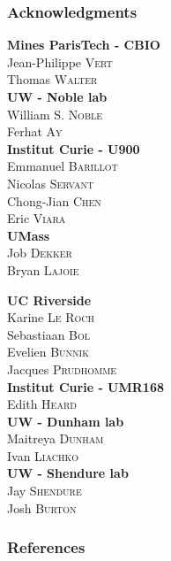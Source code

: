 \documentclass[xcolor=dvipsnames]{beamer}
\begin{document}
\begin{frame}
\frametitle{Acknowledgments}
\fboxsep=0pt
\noindent
\begin{minipage}[t]{0.48\linewidth}
\textbf{Mines ParisTech - CBIO} \\
Jean-Philippe \textsc{Vert} \\
Thomas \textsc{Walter} \\

\textbf{UW - Noble lab} \\
William S. \textsc{Noble} \\
Ferhat \textsc{Ay} \\

\textbf{Institut Curie - U900} \\
Emmanuel \textsc{Barillot} \\
Nicolas \textsc{Servant} \\
Chong-Jian \textsc{Chen} \\
Eric \textsc{Viara} \\

\textbf{UMass} \\
Job \textsc{Dekker} \\
Bryan \textsc{Lajoie} \\

\end{minipage}
\hfill%
\begin{minipage}[t]{0.48\linewidth}

\textbf{UC Riverside} \\
Karine \textsc{Le Roch} \\
Sebastiaan \textsc{Bol} \\
Evelien \textsc{Bunnik} \\
Jacques \textsc{Prudhomme} \\

\textbf{Institut Curie - UMR168} \\
Edith \textsc{Heard} \\

\textbf{UW - Dunham lab} \\
Maitreya \textsc{Dunham} \\
Ivan \textsc{Liachko} \\

\textbf{UW - Shendure lab} \\
Jay \textsc{Shendure} \\
Josh \textsc{Burton} \\

\end{minipage}

\end{frame}

\begin{frame}
  \frametitle{References}
  
  
\end{frame}

\begin{frame}[noframenumbering]

\end{frame}
\end{document}

